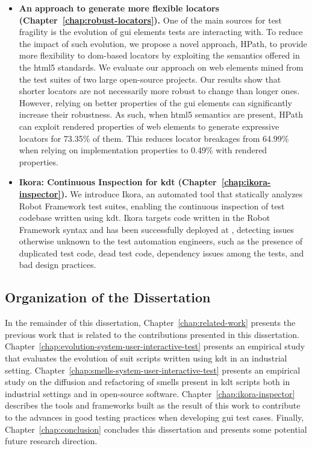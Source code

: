 \begin{itemize}
    \item \textbf{An approach to generate more flexible locators (Chapter~\ref{chap:robust-locators}).} One of the main sources for test fragility is the evolution of \gls{gui} elements tests are interacting with. To reduce the impact of such evolution, we propose a novel approach, HPath, to provide more flexibility to \gls{dom}-based locators by exploiting the semantics offered in the \gls{html}5 standards. We evaluate our approach on web elements mined from the test suites of two large open-source projects. Our results show that shorter locators are not necessarily more robust to change than longer ones. However, relying on better properties of the \gls{gui} elements can significantly increase their robustness. As such, when \gls{html}5 semantics are present, HPath can exploit rendered properties of web elements to generate expressive locators for 73.35\% of them. This reduces locator breakages from 64.99\% when relying on implementation properties to 0.49\% with rendered properties.
    
    \item \textbf{Ikora: Continuous Inspection for \gls{kdt} (Chapter~\ref{chap:ikora-inspector}).} We introduce Ikora, an automated tool that statically analyzes Robot Framework test suites, enabling the continuous inspection of test codebase written using \gls{kdt}. Ikora targets code written in the Robot Framework syntax and has been successfully deployed at \BGL, detecting issues otherwise unknown to the test automation engineers, such as the presence of duplicated test code, dead test code, dependency issues among the tests, and bad design practices.
\end{itemize}

\subsection{Organization of the Dissertation}

In the remainder of this dissertation, Chapter~\ref{chap:related-work} presents the previous work that is related to the contributions presented in this dissertation. Chapter~\ref{chap:evolution-system-user-interactive-test} presents an empirical study that evaluates the evolution of \gls{suit} scripts written using \gls{kdt} in an industrial setting. Chapter~\ref{chap:smells-system-user-interactive-test} presents an empirical study on the diffusion and refactoring of smells present in \gls{kdt} scripts both in industrial settings and in open-source software. Chapter~\ref{chap:ikora-inspector} describes the tools and frameworks built as the result of this work to contribute to the advances in good testing practices when developing \gls{gui} test cases. Finally, Chapter~\ref{chap:conclusion} concludes this dissertation and presents some potential future research direction.